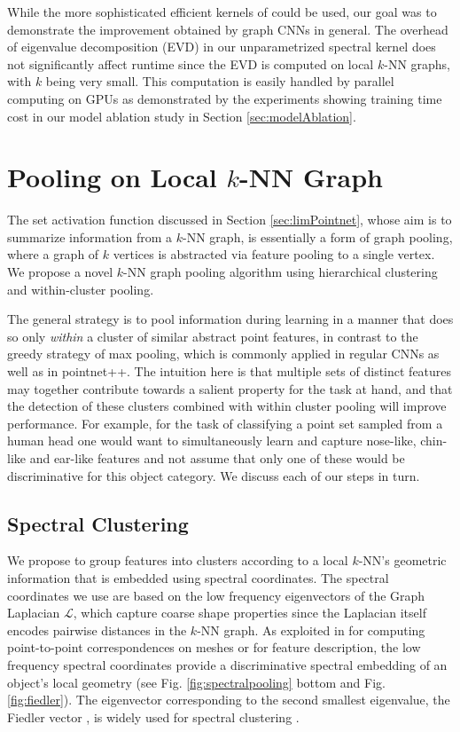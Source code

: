 \documentclass[runningheads]{llncs}
\begin{document}
While the more sophisticated efficient kernels of \cite{defferrard2016convolutional} could be used, our goal was to demonstrate the improvement obtained by graph CNNs in general. The overhead of eigenvalue decomposition (EVD) in our unparametrized spectral kernel does not significantly affect runtime since the EVD is computed on local $k$-NN graphs, with $k$ being very small. This computation is easily handled by parallel computing on GPUs as demonstrated by the experiments showing training time cost in our model ablation study in Section \ref{sec:modelAblation}.

\section{Pooling on Local $k$-NN Graph}\label{sec:specpooling}
The set activation function discussed in Section \ref{sec:limPointnet}, whose aim is to summarize information from a $k$-NN graph, is essentially a form of graph pooling, where a graph of $k$ vertices is abstracted via feature pooling to a single vertex. We propose a novel $k$-NN graph pooling algorithm using hierarchical clustering and within-cluster pooling.

The general strategy is to pool information during learning in a manner that does so only {\em within} a cluster of similar abstract point features, in contrast to the greedy strategy of max pooling, which is commonly applied in regular CNNs as well as in pointnet++. The intuition here is that multiple sets of distinct features may together contribute towards a salient property for the task at hand, and that the detection of these clusters combined with within cluster pooling will improve performance. For example, for the task of classifying a point set sampled from a human head one would want to simultaneously learn and capture nose-like, chin-like and ear-like features and not assume that only one of these would be discriminative for this object category. We discuss each of our steps in turn. 

\subsection{Spectral Clustering}\label{sec:eigL}
We propose to group features into clusters according to a local $k$-NN's geometric information that is embedded using spectral coordinates. The spectral coordinates we use are based on the low frequency eigenvectors of the Graph Laplacian $\mathcal{L}$, which capture coarse shape properties since the Laplacian itself encodes pairwise distances in the $k$-NN graph. As exploited in \cite{lombaert2013focusr} \cite{bronstein2008book} for computing point-to-point correspondences on meshes or for feature description, the low frequency spectral coordinates provide a discriminative spectral embedding of an object's local geometry (see Fig. \ref{fig:spectralpooling} bottom and Fig. \ref{fig:fiedler}). The eigenvector corresponding to the second smallest eigenvalue, the Fiedler vector \cite{chung1997spectral}, is widely used for spectral clustering \cite{shi2000normalized}.
\end{document}
